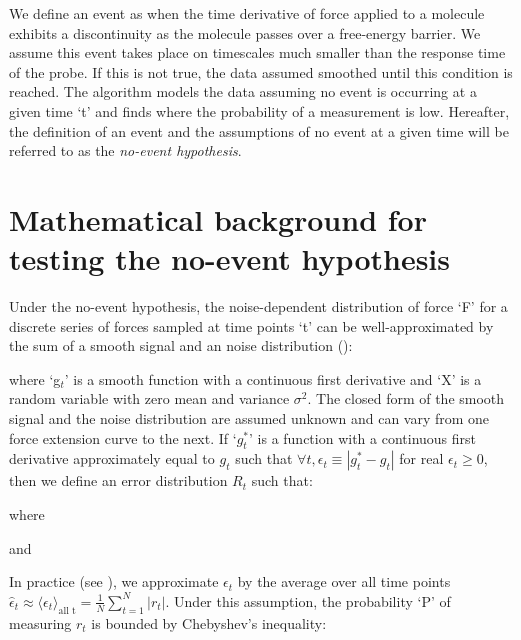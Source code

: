 We define an event as when the time derivative of force applied to a molecule exhibits a discontinuity as the molecule passes over a free-energy barrier. We assume this event takes place on timescales much smaller than the response time of the probe. If this is not true, the data assumed smoothed until this condition is reached. The algorithm models the data assuming no event is occurring at a given time `t' and finds where the probability of a measurement is low. Hereafter, the definition of an event and the assumptions of no event at a given time will be referred to as the \emph{no-event hypothesis}. 

\section{Mathematical background for testing the no-event hypothesis}

Under the no-event hypothesis, the noise-dependent distribution of force `F' for a discrete series of forces sampled at time points `t' can be well-approximated by the sum of a smooth signal and an noise distribution ():


where `g$_t$' is a smooth function with a continuous first derivative and `X' is a random variable with zero mean and variance $\sigma^2$. The closed form of the smooth signal and the noise distribution are assumed unknown and can vary from one force extension curve to the next. If `$g^{*}_t$' is a function with a continuous first derivative approximately equal to $g_t$ such that $\forall t,\epsilon_t\equiv|g^{*}_t-g_t|$ for real $\epsilon_t\ge 0$, then we define an error distribution $R_t$ such that: 


where


and 


In practice (see ), we approximate $\epsilon_t$ by the average over all time points $\hat{\epsilon}_t \approx \langle \epsilon_t \rangle_{\text{all t}} = \frac{1}{N} \sum_{t=1}^N |r_t|$. Under this assumption, the probability `P' of measuring $r_t$ is bounded by Chebyshev's inequality:

